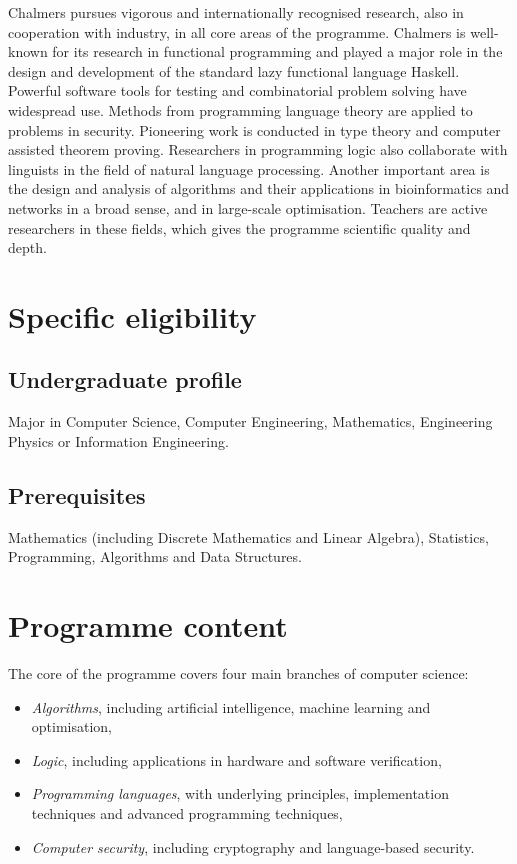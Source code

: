 \documentclass[twocolumn]{article}
\begin{document}
Chalmers pursues vigorous and internationally recognised research,
also in cooperation with industry, in all core areas of the
programme. Chalmers is well-known for its research in functional
programming and played a major role in the design and development of
the standard lazy functional language Haskell. Powerful software tools
for testing and combinatorial problem solving have widespread
use. Methods from programming language theory are applied to problems
in security. Pioneering work is conducted in type theory and computer
assisted theorem proving. Researchers in programming logic also
collaborate with linguists in the field of natural language
processing. Another important area is the design and analysis of
algorithms and their applications in bioinformatics and networks in a
broad sense, and in large-scale optimisation.  Teachers are active
researchers in these fields, which gives the programme scientific
quality and depth.

\section{Specific eligibility}
\subsection{Undergraduate profile}

Major in Computer Science, Computer Engineering, Mathematics,
Engineering Physics or Information Engineering.
 
\subsection{Prerequisites}

Mathematics (including Discrete Mathematics and Linear Algebra),
Statistics, Programming, Algorithms and Data Structures.

\section{Programme content}
 
The core of the programme covers four main branches of computer science:
\begin{itemize}
\item {\em Algorithms}, including artificial intelligence, machine
  learning and optimisation,
\item {\em Logic}, including applications in hardware and software
  verification,
\item {\em Programming languages}, with underlying principles,
  implementation techniques and advanced programming techniques,
\item {\em Computer security}, including cryptography and
  language-based security.
\end{itemize}
\end{document}

